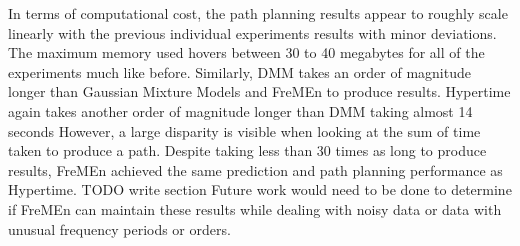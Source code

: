 In terms of computational cost, the path planning results appear to roughly
scale linearly with the previous individual experiments results with minor
deviations. The maximum memory used hovers between 30 to 40 megabytes for all
of the experiments much like before. Similarly, DMM takes an order of
magnitude longer than Gaussian Mixture Models and FreMEn to produce results.
Hypertime again takes another order of magnitude longer than DMM taking
almost 14 seconds However, a large disparity is visible when looking at the
sum of time taken to produce a path. Despite taking less than 30 times as long
to produce results, FreMEn achieved the same prediction and path planning
performance as Hypertime. TODO write section Future work would need to be done
to determine if FreMEn can maintain these results while dealing with noisy
data or data with unusual frequency periods or orders. \\



